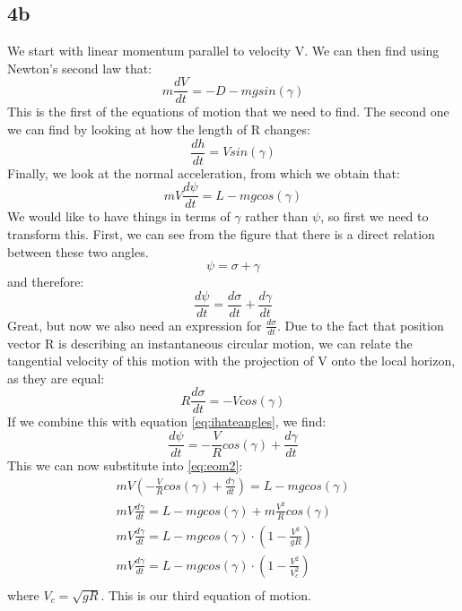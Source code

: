 \subsection{4b}
We start with linear momentum parallel to velocity V. We can then find using Newton's second law that:
\begin{equation}\label{eq:eom1}
    m \frac{dV}{dt} = -D - m g sin(\gamma)
\end{equation}
This is the first of the equations of motion that we need to find. The second one we can find by looking at how the length of R changes:
\begin{equation} \label{eq:eom3}
    \frac{dh}{dt} = V sin(\gamma)
\end{equation}
Finally, we look at the normal acceleration, from which we obtain that:
\begin{equation}\label{eq:eom2}
    m V \frac{d\psi}{dt} = L - m g cos(\gamma)
\end{equation}
We would like to have things in terms of $\gamma$ rather than $\psi$, so first we need to transform this. First, we can see from the figure that there is a direct relation between these two angles.
\begin{equation}
    \psi = \sigma + \gamma
\end{equation}
and therefore:
\begin{equation} \label{eq:ihateangles}
    \frac{d\psi}{dt} = \frac{d\sigma}{dt} + \frac{d\gamma}{dt}
\end{equation}
Great, but now we also need an expression for $\frac{d\sigma}{dt}$. Due to the fact that position vector R is describing an instantaneous circular motion, we can relate the tangential velocity of this motion with the projection of V onto the local horizon, as they are equal:
\begin{equation}
    R\frac{d\sigma}{dt} = -V cos(\gamma)
\end{equation}
If we combine this with equation \ref{eq:ihateangles}, we find:
\begin{equation}
    \frac{d\psi}{dt} = -\frac{V}{R} cos(\gamma) + \frac{d\gamma}{dt}
\end{equation}
This we can now substitute into \ref{eq:eom2}:
\begin{equation}
\begin{split}
    m V \left( -\frac{V}{R} cos(\gamma) + \frac{d\gamma}{dt} \right) = L - m g cos(\gamma) \\
    m V \frac{d\gamma}{dt} = L - m g cos(\gamma) + m \frac{V^2}{R} cos(\gamma) \\
    m V \frac{d\gamma}{dt} = L - m g cos(\gamma) \cdot \left(1 - \frac{V^2}{gR} \right) \\
    m V \frac{d\gamma}{dt} = L - m g cos(\gamma) \cdot \left(1 - \frac{V^2}{V_c^2} \right)\\
\end{split}
\end{equation}
where $V_c = \sqrt{gR}$. This is our third equation of motion.

